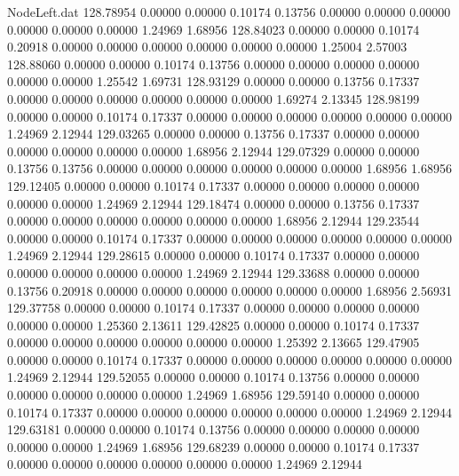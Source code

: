 \begin{filecontents}{NodeLeft.dat}
 128.78954    0.00000    0.00000     0.10174    0.13756    0.00000    0.00000    0.00000    0.00000    0.00000    0.00000    1.24969    1.68956
 128.84023    0.00000    0.00000     0.10174    0.20918    0.00000    0.00000    0.00000    0.00000    0.00000    0.00000    1.25004    2.57003
 128.88060    0.00000    0.00000     0.10174    0.13756    0.00000    0.00000    0.00000    0.00000    0.00000    0.00000    1.25542    1.69731
 128.93129    0.00000    0.00000     0.13756    0.17337    0.00000    0.00000    0.00000    0.00000    0.00000    0.00000    1.69274    2.13345
 128.98199    0.00000    0.00000     0.10174    0.17337    0.00000    0.00000    0.00000    0.00000    0.00000    0.00000    1.24969    2.12944
 129.03265    0.00000    0.00000     0.13756    0.17337    0.00000    0.00000    0.00000    0.00000    0.00000    0.00000    1.68956    2.12944
 129.07329    0.00000    0.00000     0.13756    0.13756    0.00000    0.00000    0.00000    0.00000    0.00000    0.00000    1.68956    1.68956
 129.12405    0.00000    0.00000     0.10174    0.17337    0.00000    0.00000    0.00000    0.00000    0.00000    0.00000    1.24969    2.12944
 129.18474    0.00000    0.00000     0.13756    0.17337    0.00000    0.00000    0.00000    0.00000    0.00000    0.00000    1.68956    2.12944
 129.23544    0.00000    0.00000     0.10174    0.17337    0.00000    0.00000    0.00000    0.00000    0.00000    0.00000    1.24969    2.12944
 129.28615    0.00000    0.00000     0.10174    0.17337    0.00000    0.00000    0.00000    0.00000    0.00000    0.00000    1.24969    2.12944
 129.33688    0.00000    0.00000     0.13756    0.20918    0.00000    0.00000    0.00000    0.00000    0.00000    0.00000    1.68956    2.56931
 129.37758    0.00000    0.00000     0.10174    0.17337    0.00000    0.00000    0.00000    0.00000    0.00000    0.00000    1.25360    2.13611
 129.42825    0.00000    0.00000     0.10174    0.17337    0.00000    0.00000    0.00000    0.00000    0.00000    0.00000    1.25392    2.13665
 129.47905    0.00000    0.00000     0.10174    0.17337    0.00000    0.00000    0.00000    0.00000    0.00000    0.00000    1.24969    2.12944
 129.52055    0.00000    0.00000     0.10174    0.13756    0.00000    0.00000    0.00000    0.00000    0.00000    0.00000    1.24969    1.68956
 129.59140    0.00000    0.00000     0.10174    0.17337    0.00000    0.00000    0.00000    0.00000    0.00000    0.00000    1.24969    2.12944
 129.63181    0.00000    0.00000     0.10174    0.13756    0.00000    0.00000    0.00000    0.00000    0.00000    0.00000    1.24969    1.68956
 129.68239    0.00000    0.00000     0.10174    0.17337    0.00000    0.00000    0.00000    0.00000    0.00000    0.00000    1.24969    2.12944

\end{filecontents}
